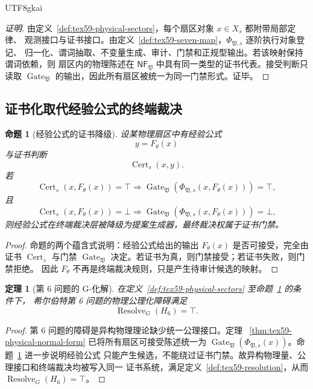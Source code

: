 \documentclass[12pt]{article}
\newtheorem{theorem}{定理}[section]
\newtheorem{proposition}{命题}[section]
\newcommand{\Vsys}{\mathfrak V}
\newcommand{\NF}{\mathsf{NF}}
\DeclareMathOperator{\Cert}{Cert}
\DeclareMathOperator{\Resolve}{Resolve}
\DeclareMathOperator{\Gate}{Gate}
\begin{document}
\begin{CJK*}{UTF8}{gkai}
\begin{proof}[证明]
由定义~\ref{def:tex59-physical-sectors}，每个扇区对象 \(x\in X_s\) 都附带局部定律、
观测接口与证书接口。由定义~\ref{def:tex59-seven-map}，\(\Phi_{\Vsys,s}\) 逐阶执行对象登记、
归一化、谓词抽取、不变量生成、审计、门禁和正规型输出。若该映射保持谓词依赖，则
扇区内的物理陈述在 \(\NF_{\Vsys}\) 中具有同一类型的证书代表。接受判断只读取
\(\Gate_{\Vsys}\) 的输出，因此所有扇区被统一为同一门禁形式。证毕。
\end{proof}

\subsection{证书化取代经验公式的终端裁决}
\label{subsec:tex59-physics-certificate}

\begin{proposition}[经验公式的证书降级]
\label{prop:tex59-empirical-downgrade}
设某物理扇区中有经验公式
\[
  y=F_{\theta}(x)
\]
与证书判断
\[
  \Cert_s(x,y).
\]
若
\[
  \Cert_s(x,F_{\theta}(x))=\top
  \Longrightarrow
  \Gate_{\Vsys}(\Phi_{\Vsys,s}(x,F_{\theta}(x)))=\top,
\]
且
\[
  \Cert_s(x,F_{\theta}(x))=\bot
  \Longrightarrow
  \Gate_{\Vsys}(\Phi_{\Vsys,s}(x,F_{\theta}(x)))=\bot,
\]
则经验公式在终端裁决层被降级为提案生成器，最终裁决权属于证书门禁。
\end{proposition}

\begin{proof}
命题的两个蕴含式说明：经验公式给出的输出 \(F_{\theta}(x)\) 是否可接受，完全由证书
\(\Cert_s\) 与门禁 \(\Gate_{\Vsys}\) 决定。若证书为真，则门禁接受；若证书失败，则门禁拒绝。
因此 \(F_{\theta}\) 不再是终端裁决规则，只是产生待审计候选的映射。
\end{proof}

\begin{theorem}[第 6 问题的 G-化解]
\label{thm:tex59-h6}
在定义~\ref{def:tex59-physical-sectors} 至命题~\ref{prop:tex59-empirical-downgrade} 的条件下，
希尔伯特第 6 问题的物理公理化障碍满足
\[
  \Resolve_G(H_6)=\top.
\]
\end{theorem}

\begin{proof}
第 6 问题的障碍是异构物理理论缺少统一公理接口。定理
~\ref{thm:tex59-physical-normal-form} 已将所有扇区可接受陈述统一为
\(\Gate_{\Vsys}(\Phi_{\Vsys,s}(x))\)。命题~\ref{prop:tex59-empirical-downgrade} 进一步说明经验公式
只能产生候选，不能绕过证书门禁。故异构物理量、公理接口和终端裁决均被写入同一
证书系统，满足定义~\ref{def:tex59-resolution}，从而 \(\Resolve_G(H_6)=\top\)。
\end{proof}


\end{CJK*}
\end{document}
